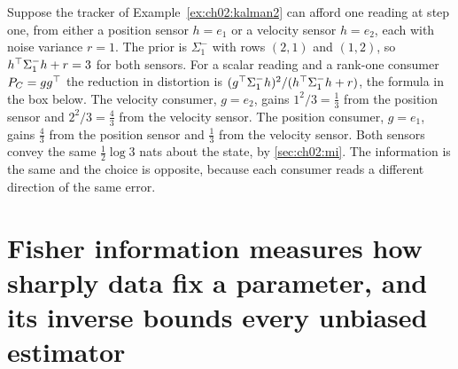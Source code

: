 \begin{example}\label{ex:ch02:sensor}
Suppose the tracker of Example~\ref{ex:ch02:kalman2} can afford one reading at
step one, from either a position sensor $h=e_1$ or a velocity sensor $h=e_2$,
each with noise variance $r=1$. The prior is $\Sigma_1^-$ with rows $(2,1)$ and
$(1,2)$, so $h^{\top}\Sigma_1^-h+r=3$ for both sensors. For a scalar reading and a
rank-one consumer $P_C=gg^{\top}$ the reduction in distortion is
$(g^{\top}\Sigma_1^-h)^2/(h^{\top}\Sigma_1^-h+r)$, the formula in the box below. The
velocity consumer, $g=e_2$, gains $1^2/3=\tfrac13$ from the position sensor and
$2^2/3=\tfrac43$ from the velocity sensor. The position consumer, $g=e_1$, gains
$\tfrac43$ from the position sensor and $\tfrac13$ from the velocity sensor.
Both sensors convey the same $\tfrac12\log3$ nats about the state, by
\cref{sec:ch02:mi}. The information is the same and the choice is opposite,
because each consumer reads a different direction of the same error.
\end{example}



\section{Fisher information measures how sharply data fix a parameter, and its inverse bounds every unbiased estimator}\label{sec:ch02:fisher}

